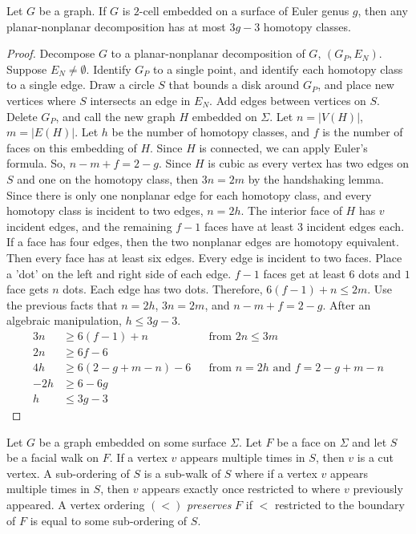 \begin{lemma}
	Let $G$ be a graph. If \(G\) is \(2\)-cell embedded on a surface of Euler genus \(g\), then any planar-nonplanar decomposition has at most \(3g-3\) homotopy classes. 
\end{lemma}
\begin{proof}
	Decompose \(G\) to a planar-nonplanar decomposition of \(G\), \((G_P, E_N)\). Suppose \(E_N \neq \emptyset\). Identify \(G_P\) to a single point, and identify each homotopy class to a single edge. Draw a circle $S$ that bounds a disk around \(G_P\), and place new vertices where $S$ intersects an edge in $E_N$. Add edges between vertices on $S$. Delete \(G_P\), and call the new graph \(H\) embedded on $\Sigma$. Let \(n = |V(H)|\), \(m = |E(H)|\). Let \(h\) be the number of homotopy classes, and \(f\) is the number of faces on this embedding of $H$. Since $H$ is connected, we can apply Euler's formula. So, \(n - m + f = 2 - g\). Since \(H\) is cubic as every vertex has two edges on $S$ and one on the homotopy class, then \(3n = 2m\) by the handshaking lemma. Since there is only one nonplanar edge for each homotopy class, and every homotopy class is incident to two edges, \(n = 2h\). The interior face of \(H\) has \(v\) incident edges, and the remaining \(f-1\) faces have at least 3 incident edges each. If a face has four edges, then the two nonplanar edges are homotopy equivalent. Then every face has at least six edges. Every edge is incident to two faces. Place a 'dot' on the left and right side of each edge. $f-1$ faces get at least $6$ dots and $1$ face gets $n$ dots. Each edge has two dots. Therefore, \(  6(f-1) + n \leq 2m \). Use the previous facts that $n = 2h$, $3n = 2m$, and $n - m + f = 2 - g$. After an algebraic manipulation, \(h \leq 3g - 3 \). 
	\begin{align*}
		3n  & \geq 6(f - 1) + n         && \text{from } 2n \leq 3m \\
		2n  & \geq 6f - 6               \\
		4h  & \geq 6(2 - g + m - n) - 6 && \text{from } n = 2h \text{ and } f = 2 - g + m - n\\
		-2h & \geq 6 - 6g               \\
		h   & \leq 3g - 3
	\end{align*}
\end{proof}

Let \(G\) be a graph embedded on some surface $\Sigma$. Let $F$ be a face on $\Sigma$ and let $S$ be a facial walk on $F$. If a vertex $v$ appears multiple times in $S$, then $v$ is a cut vertex. A sub-ordering of $S$ is a sub-walk of $S$ where if a vertex $v$ appears multiple times in $S$, then $v$ appears exactly once restricted to where $v$ previously appeared. A vertex ordering \((<)\) \textit{preserves} \(F\) if $<$ restricted to the boundary of $F$ is equal to some sub-ordering of $S$.

